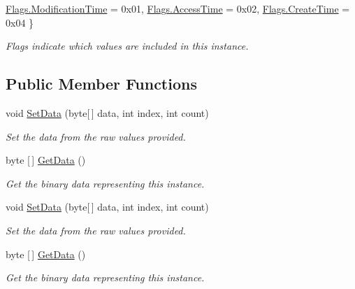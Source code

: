 \begin{DoxyCompactItemize}
\hyperlink{class_i_c_sharp_code_1_1_sharp_zip_lib_1_1_zip_1_1_extended_unix_data_afe55ff53ac4b73505f17a5ea88f291e5ac6f0f2785906f5f0c7a8bac63db3582c}{Flags.\+Modification\+Time} = 0x01, 
\newline
\hyperlink{class_i_c_sharp_code_1_1_sharp_zip_lib_1_1_zip_1_1_extended_unix_data_afe55ff53ac4b73505f17a5ea88f291e5aedd7cfde861d4270e656615f65e23dcc}{Flags.\+Access\+Time} = 0x02, 
\hyperlink{class_i_c_sharp_code_1_1_sharp_zip_lib_1_1_zip_1_1_extended_unix_data_afe55ff53ac4b73505f17a5ea88f291e5aa73e2df217ce2d84548646c962f9ed4a}{Flags.\+Create\+Time} = 0x04
 \}\begin{DoxyCompactList}\small\item\em Flags indicate which values are included in this instance. \end{DoxyCompactList}
\end{DoxyCompactItemize}
\subsection*{Public Member Functions}
\begin{DoxyCompactItemize}
\item 
void \hyperlink{class_i_c_sharp_code_1_1_sharp_zip_lib_1_1_zip_1_1_extended_unix_data_a7adc618dce3dc60e9e5196f80789ab06}{Set\+Data} (byte\mbox{[}$\,$\mbox{]} data, int index, int count)
\begin{DoxyCompactList}\small\item\em Set the data from the raw values provided. \end{DoxyCompactList}\item 
byte \mbox{[}$\,$\mbox{]} \hyperlink{class_i_c_sharp_code_1_1_sharp_zip_lib_1_1_zip_1_1_extended_unix_data_affc68b6149e70affca3d7bcd41d9634b}{Get\+Data} ()
\begin{DoxyCompactList}\small\item\em Get the binary data representing this instance. \end{DoxyCompactList}\item 
void \hyperlink{class_i_c_sharp_code_1_1_sharp_zip_lib_1_1_zip_1_1_extended_unix_data_a7adc618dce3dc60e9e5196f80789ab06}{Set\+Data} (byte\mbox{[}$\,$\mbox{]} data, int index, int count)
\begin{DoxyCompactList}\small\item\em Set the data from the raw values provided. \end{DoxyCompactList}\item 
byte \mbox{[}$\,$\mbox{]} \hyperlink{class_i_c_sharp_code_1_1_sharp_zip_lib_1_1_zip_1_1_extended_unix_data_affc68b6149e70affca3d7bcd41d9634b}{Get\+Data} ()
\begin{DoxyCompactList}\small\item\em Get the binary data representing this instance. \end{DoxyCompactList}\end{DoxyCompactItemize}
